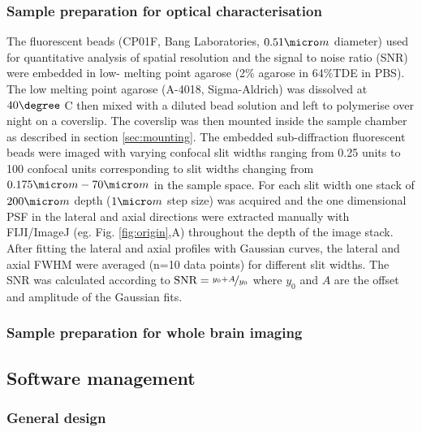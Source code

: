 \documentclass[12pt]{spieman}  %
\begin{document}
\subsubsection{Sample preparation for optical characterisation}
The fluorescent beads (CP01F, Bang Laboratories, $0.51 \micro m$ diameter) used for quantitative analysis of spatial resolution and the signal to noise ratio (SNR) were embedded in low- melting point agarose (2\% agarose in 64\%TDE in PBS). The low melting point agarose (A-4018, Sigma-Aldrich) was dissolved at $40 \degree$ C then mixed with a diluted bead solution and left to polymerise over night on a coverslip. The coverslip was then mounted inside the sample chamber as described in section \ref{sec:mounting}. The embedded sub-diffraction fluorescent beads were imaged with varying confocal slit widths ranging from 0.25 units to 100 confocal units corresponding to slit widths changing from $0.175 \micro m-70 \micro m$ in the sample space. For each slit width one stack of $200\micro m$ depth ($1 \micro m$ step size) was acquired and the one dimensional PSF in the lateral and axial directions were extracted manually with FIJI/ImageJ (eg. Fig. \ref{fig:origin},A) throughout the depth of the image stack. After fitting the lateral and axial profiles with Gaussian curves, the lateral and axial FWHM were averaged (n=10 data points) for different slit widths. The SNR was calculated according to $\text{SNR} = \nicefrac{y_0 + A}{y_0}$ where $y_0$ and $A$ are the offset and amplitude of the Gaussian fits.

\subsubsection{Sample preparation for whole brain imaging}

\subsection{Software management}

\subsubsection{General design}
\end{document}
